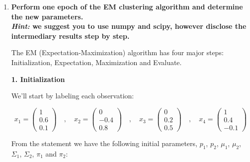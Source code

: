 \documentclass[12pt]{article}
\begin{document}
\vskip 0.2cm
\begin{enumerate}[leftmargin=\labelsep]
    \item \textbf{Perform one epoch of the EM clustering algorithm and determine the new parameters.}\\
          \textbf{\textit{Hint:} we suggest you to use numpy and scipy, however disclose the intermediary results step by step.}

          \vskip 0.3cm
          The EM (Expectation-Maximization) algorithm has four major steps:
          Initialization, Expectation, Maximization and Evaluate.

          \vskip 0.2cm
          \begin{large}\textbf{1. Initialization}\end{large}
          \vskip 0.1cm

          We'll start by labeling each observation:

          $$
              x_1 = \begin{pmatrix} 1 \\ 0.6 \\ 0.1 \end{pmatrix}
              \quad,\quad
              x_2 = \begin{pmatrix} 0 \\ -0.4 \\ 0.8 \end{pmatrix}
              \quad,\quad
              x_3 = \begin{pmatrix} 0 \\ 0.2 \\ 0.5 \end{pmatrix}
              \quad,\quad
              x_4 = \begin{pmatrix} 1 \\ 0.4 \\ -0.1 \end{pmatrix}
          $$

          From the statement we have the following initial parameters, $p_1$, $p_2$, $\mu_1$, $\mu_2$, $\Sigma_1$,
          $\Sigma_2$, $\pi_1$ and $\pi_2$:


\end{enumerate}
\end{document}
